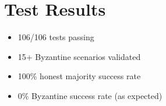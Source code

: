 \section{Test Results}

\begin{itemize}
    \item 106/106 tests passing
    \item 15+ Byzantine scenarios validated
    \item 100\% honest majority success rate
    \item 0\% Byzantine success rate (as expected)
\end{itemize}
